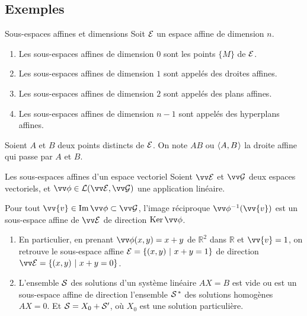 \documentclass[bigger]{m53beamer}
\begin{document}
\subsection{Exemples}
  \begin{frame}{Sous-espaces affines et dimensions}
    Soit $\mathcal{E}$ un espace affine de dimension $n$.
    \begin{enumerate}[<+(1)->]
      \item Les sous-espaces affines de dimension $0$ sont les points $\{M\}$ de $\mathcal{E}$.
      \item Les sous-espaces affines de dimension $1$ sont appelés \alert{des droites affines}.
      \item Les sous-espaces affines de dimension $2$ sont appelés \alert{des plans affines}.
      \item Les sous-espaces affines de dimension $n-1$ sont appelés \alert{des hyperplans affines}.
    \end{enumerate}\pause

    Soient $A$ et $B$ deux points distincts de $\mathcal{E}$. On note $AB$ ou $\langle{A,B}\kern.07em\rangle$ la droite affine qui passe par $A$ et $B$.
  \end{frame}
  \begin{frame}{Les sous-espaces affines d'un espace vectoriel}
    Soient $\ev{E}$ et $\ev{G}$ deux espaces vectoriels, et $\vv\phi \in \lin(\ev{E},\ev{G})$ une application linéaire.\pause\\
    \begin{proposition}
      Pour tout $\vv{v}\in\im\vv\phi\subset\ev{G}$, l'image réciproque $\vv\phi^{-1}(\vv{v})$ est un sous-espace affine de $\ev{E}$ de direction $\ker{\vv\phi}$.
    \end{proposition}
    \begin{enumerate}[<+(1)->]
      \item En particulier, en prenant $\vv\phi(x,y)=x+y$ de $\mathbb{R}^{2}$ dans $\mathbb{R}$ et $\vv{v}=1$, on retrouve le sous-espace affine $\mathcal{E}=\{(x,y)\ |\ x+y=1 \}$ de direction $\ev{E}=\{(x,y)\ |\ x+y=0 \}$.
      \item L'ensemble $\mathcal{S}$ des solutions d'un système linéaire $AX=B$ est vide ou est un sous-espace affine de direction l'ensemble $\mathcal{S^{\,\ast}}$ des solutions homogènes $AX=0$. Et $\mathcal{S}=X_{0}+\mathcal{S}'$, où $X_{0}$ est une solution particulière.
    \end{enumerate}
  \end{frame}
\end{document}
